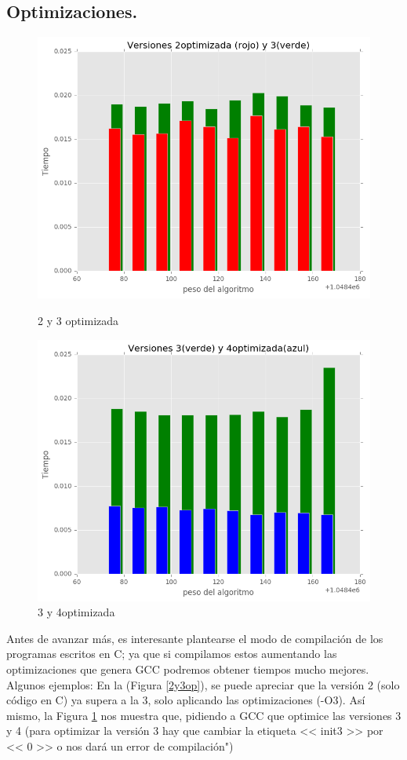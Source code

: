 \documentclass[a4paper, 11pt]{article}
\begin{document}
\subsection{Optimizaciones.}
\begin{figure}[!hbp]
	\includegraphics[scale=0.6]{2y3op.png}
	\caption{2 y 3 optimizada	\label{2y3op}}
	\includegraphics[scale=0.6]{3y4op.png}
	\caption{3 y 4optimizada	\label{3y4op}}
\end{figure}

Antes de avanzar más, es interesante plantearse el modo de compilación de los programas escritos en C; ya que si compilamos estos aumentando las optimizaciones que genera GCC podremos obtener tiempos mucho mejores. Algunos ejemplos:
En la (Figura \ref{2y3op}), se puede apreciar que la versión 2 (solo código en C) ya supera a la 3, solo aplicando las optimizaciones (-O3). Así mismo, la Figura \ref{3y4op} nos muestra que, pidiendo a GCC que optimice las versiones 3 y 4 (para optimizar la versión 3 hay que cambiar la etiqueta << init3 >> por << 0  >> o nos dará un error de compilación") 
\end{document}
